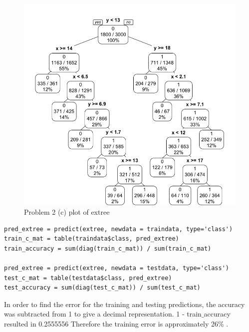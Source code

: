 \documentclass[11pt]{article}
\begin{document}
\begin{figure}[H]
\begin{center}
\includegraphics[scale=0.35]{images/extree_fancy}
\caption{Problem 2 (c) plot of extree }
\end{center}
\end{figure}

\begin{Verbatim}
pred_extree = predict(extree, newdata = traindata, type='class')
train_c_mat = table(traindata$class, pred_extree)
train_accuracy = sum(diag(train_c_mat)) / sum(train_c_mat)

pred_extree = predict(extree, newdata = testdata, type='class')
test_c_mat = table(testdata$class, pred_extree)
test_accuracy = sum(diag(test_c_mat)) / sum(test_c_mat)
\end{Verbatim}

In order to find the error for the training and testing predictions, 
the accuracy was subtracted from 1 to give a decimal representation. 
1 - train$\_$accuracy resulted in 
 0.2555556
Therefore the training error is approximately 26\%
.
\end{document}
